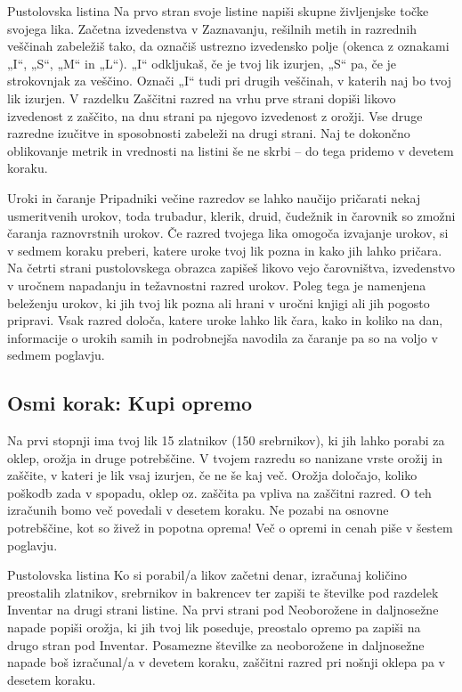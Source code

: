 \begin{rpg-titlebox}{Pustolovska listina}
    Na prvo stran svoje listine napiši skupne življenjske točke svojega lika. Začetna izvedenstva v Zaznavanju, rešilnih metih in razrednih veščinah zabeležiš tako, da označiš ustrezno izvedensko polje (okenca z oznakami „I“, „S“, „M“ in „L“). „I“ odkljukaš, če je tvoj lik izurjen, „S“ pa, če je strokovnjak za veščino. Označi „I“ tudi pri drugih veščinah, v katerih naj bo tvoj lik izurjen. V razdelku Zaščitni razred na vrhu prve strani dopiši likovo izvedenost z zaščito, na dnu strani pa njegovo izvedenost z orožji. Vse druge razredne izučitve in sposobnosti zabeleži na drugi strani. Naj te dokončno oblikovanje metrik in vrednosti na listini še ne skrbi -- do tega pridemo v devetem koraku.
\end{rpg-titlebox}

\begin{rpg-titlebox}{Uroki in čaranje}
    Pripadniki večine razredov se lahko naučijo pričarati nekaj usmeritvenih urokov, toda trubadur, klerik, druid, čudežnik in čarovnik so zmožni čaranja raznovrstnih urokov. Če razred tvojega lika omogoča izvajanje urokov, si v sedmem koraku preberi, katere uroke tvoj lik pozna in kako jih lahko pričara. Na četrti strani pustolovskega obrazca zapišeš likovo vejo čarovništva, izvedenstvo v uročnem napadanju in težavnostni razred urokov. Poleg tega je namenjena beleženju urokov, ki jih tvoj lik pozna ali hrani v uročni knjigi ali jih pogosto pripravi. Vsak razred določa, katere uroke lahko lik čara, kako in koliko na dan, informacije o urokih samih in podrobnejša navodila za čaranje pa so na voljo v sedmem poglavju.
\end{rpg-titlebox}

\subsection{Osmi korak: Kupi opremo}
Na prvi stopnji ima tvoj lik 15 zlatnikov (150 srebrnikov), ki jih lahko porabi za oklep, orožja in druge potrebščine. V tvojem razredu so nanizane vrste orožij in zaščite, v kateri je lik vsaj izurjen, če ne še kaj več. Orožja določajo, koliko poškodb zada v spopadu, oklep oz. zaščita pa vpliva na zaščitni razred. O teh izračunih bomo več povedali v desetem koraku. Ne pozabi na osnovne potrebščine, kot so živež in popotna oprema! Več o opremi in cenah piše v šestem poglavju.

\begin{rpg-titlebox}{Pustolovska listina}
    Ko si porabil/a likov začetni denar, izračunaj količino preostalih zlatnikov, srebrnikov in bakrencev ter zapiši te številke pod razdelek Inventar na drugi strani listine. Na prvi strani pod Neoborožene in daljnosežne napade popiši orožja, ki jih tvoj lik poseduje, preostalo opremo pa zapiši na drugo stran pod Inventar. Posamezne številke za neoborožene in daljnosežne napade boš izračunal/a v devetem koraku, zaščitni razred pri nošnji oklepa pa v desetem koraku.
\end{rpg-titlebox}